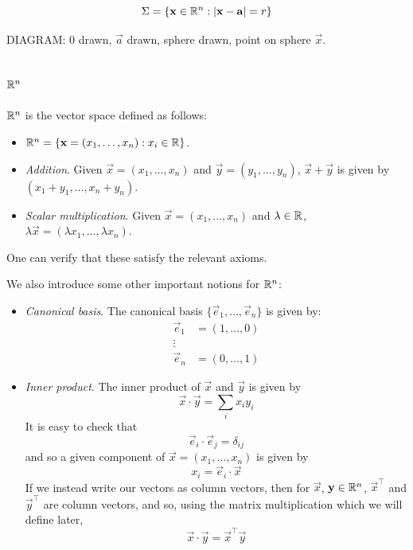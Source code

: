 \documentclass{../../template/note}
\begin{document}
    \[
        \Sigma = \{\vec x \in \RR^n: |\vec x - \vec a| = r\}
    \]
    
    DIAGRAM: 0 drawn, \(\vec a\) drawn, sphere drawn, point on sphere \(\vec x\).

    \subsection{\(\mathbb R^n\)}

    \begin{definition}
        \(\mathbb R^n\) is the vector space defined as follows:
        \begin{itemize}
            \item \(\RR^n = \{\vec x = (x_1, \dots, x_n): x_i \in \RR\}\).
            \item \emph{Addition}. Given \(\vec x = (x_1, \dots, x_n)\) and \(\vec y = (y_1, \dots, y_n)\), \(\vec x + \vec y\) is given by \((x_1 + y_1, \dots, x_n + y_n)\).
            \item \emph{Scalar multiplication}. Given \(\vec x = (x_1, \dots, x_n)\) and \(\lambda \in \mathbb R\), \(\lambda \vec x = (\lambda x_1, \dots, \lambda x_n)\).
        \end{itemize}
        One can verify that these satisfy the relevant axioms.

        We also introduce some other important notions for \(\mathbb R^n\):
        \begin{itemize}
            \item \emph{Canonical basis}. The canonical basis \(\{\vec e_1, \dots, \vec e_n\}\) is given by:
            \begin{align*}
                \vec e_1 &= (1, \dots, 0) \\
                \vdots \\
                \vec e_n &= (0, \dots, 1)
            \end{align*}
            \item \emph{Inner product}. The inner product of \(\vec x\) and \(\vec y\) is given by
            \[
                \vec x \cdot \vec y = \sum_i x_iy_i
            \]
            It is easy to check that
            \[
                \vec e_i \cdot \vec e_j = \delta_{ij}
            \]
            and so a given component of \(\vec x = (x_1, \dots, x_n)\) is given by
            \[
                x_i = \vec e_i \cdot \vec x
            \]
            If we instead write our vectors as column vectors, then for \(\vec x\), \(\vec y \in \RR^n\), \(\vec x^\intercal\) and \(\vec y^\intercal\) are column vectors, and so, using the matrix multiplication which we will define later,
            \[
                \vec x \cdot \vec y = \vec x^\intercal \vec y
            \]
        \end{itemize}
    \end{definition}
    
\end{document}
